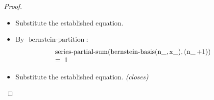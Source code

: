 \documentclass[11pt]{article}
\theoremstyle{plain}
\begin{document}
\begin{proof}
\begin{itemize}[leftmargin=2.8em, itemsep=4pt, parsep=1pt]
  \item[\textbf{151}] Substitute the established equation.
  \item[\textbf{152}] By $\operatorname{bernstein\text{-}partition}$:
\begin{equation*}
\begin{array}{@{}l@{}} \operatorname{series\text{-}partial\text{-}sum}(\operatorname{bernstein\text{-}basis}(\operatorname{n\_}, \operatorname{x\_}), (\operatorname{n\_} + 1)) \\ =\; 1 \end{array}
\end{equation*}

  \item[\textbf{153--154}] Substitute the established equation.  \emph{(closes)}
\end{itemize}
\end{proof}
\end{document}
